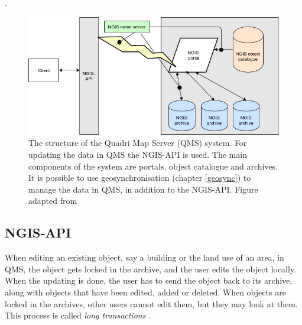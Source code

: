 .

\begin{figure}[H]
	\centering
	\includegraphics[scale=0.5]{img/ngiss.png}
	\caption{The structure of the Quadri Map Server (QMS) system. For updating the data in QMS the NGIS-API is used.  The main components of the system are portals, object catalogue and archives. It is possible to use geosynchronisation (chapter \ref{geosync}) to manage the data in QMS, in addition to the NGIS-API. Figure adapted from \citep{Kartverket2017b} }
	\label{fig:qmsfig}
\end{figure}

\subsection{NGIS-API}\label{qms-api}

When editing an existing object, say a building or the land use of an area, in QMS, the object gets locked in the archive, and the user edits the object locally. When the updating is done, the user has to send the object back to its archive, along with objects that have been edited, added or deleted. When objects are locked in the archives, other users cannot edit them, but they may look at them. This process is called \textit{long transactions} \citep{Kartverket2017b}.





